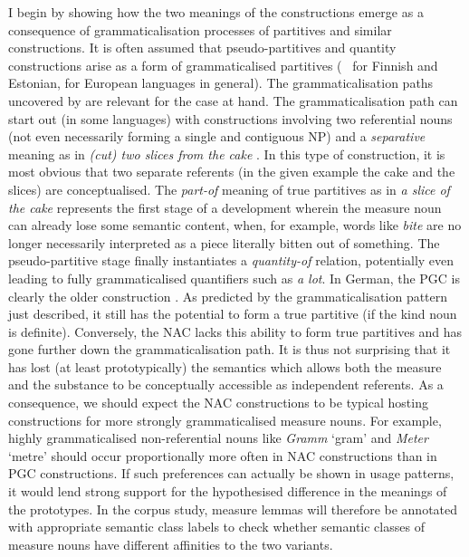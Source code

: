 I begin by showing how the two meanings of the constructions emerge as a consequence of grammaticalisation processes of partitives and similar constructions.
It is often assumed that pseudo-partitives and quantity constructions arise as a form of grammaticalised partitives (\eg\ \citealp[536--539]{Koptjevskaja2001} for Finnish and Estonian, \citealp[559]{Koptjevskaja2001} for European languages in general).
The grammaticalisation paths uncovered by \citet[esp.\ 526--530]{Koptjevskaja2001} are relevant for the case at hand.
The grammaticalisation path can start out (in some languages) with constructions involving two referential nouns (not even necessarily forming a single and contiguous NP) and a \textit{separative} meaning as in \textit{(cut) two slices from the cake} \citep[535]{Koptjevskaja2001}.
In this type of construction, it is most obvious that two separate referents (in the given example the cake and the slices) are conceptualised.
The \textit{part-of} meaning of true partitives as in \textit{a slice of the cake} represents the first stage of a development wherein the measure noun can already lose some semantic content, when, for example, words like \textit{bite} are no longer necessarily interpreted as a piece literally bitten out of something.
The pseudo-partitive stage finally instantiates a \textit{quantity-of} relation, potentially even leading to fully grammaticalised quantifiers such as \textit{a lot}.
In German, the PGC is clearly the older construction \citep{Zimmer2015}.
As predicted by the grammaticalisation pattern just described, it still has the potential to form a true partitive (if the kind noun is definite).
Conversely, the NAC lacks this ability to form true partitives and has gone further down the grammaticalisation path.
It is thus not surprising that it has lost (at least prototypically) the semantics which allows both the measure and the substance to be conceptually accessible as independent referents.
As a consequence, we should expect the NAC constructions to be typical hosting constructions for more strongly grammaticalised measure nouns.
For example, highly grammaticalised non-referential nouns like \textit{Gramm} `gram' and \textit{Meter} `metre' should occur proportionally more often in NAC constructions than in PGC constructions.
If such preferences can actually be shown in usage patterns, it would lend strong support for the hypothesised difference in the meanings of the prototypes.
In the corpus study, measure lemmas will therefore be annotated with appropriate semantic class labels to check whether semantic classes of measure nouns have different affinities to the two variants.
